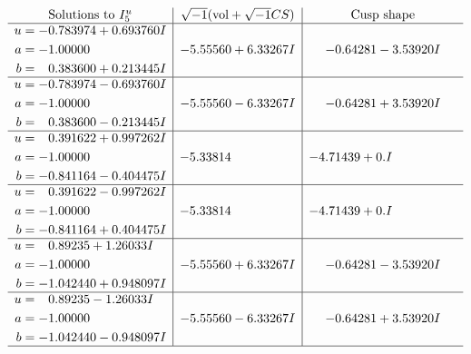 \documentclass[1p]{elsarticle_modified}
\theoremstyle{definition}
\newcommand{\I}{\sqrt{-1}}
\begin{document}
$$\begin{array}{c|c|c}  
\text{Solutions to }I^u_{5}& \I (\text{vol} + \sqrt{-1}CS) & \text{Cusp shape}\\
 \hline 
\begin{aligned}
u &= -0.783974 + 0.693760 I \\
a &= -1.00000\phantom{ +0.000000I} \\
b &= \phantom{-}0.383600 + 0.213445 I\end{aligned}
 & -5.55560 + 6.33267 I & -0.64281 - 3.53920 I \\ \hline\begin{aligned}
u &= -0.783974 - 0.693760 I \\
a &= -1.00000\phantom{ +0.000000I} \\
b &= \phantom{-}0.383600 - 0.213445 I\end{aligned}
 & -5.55560 - 6.33267 I & -0.64281 + 3.53920 I \\ \hline\begin{aligned}
u &= \phantom{-}0.391622 + 0.997262 I \\
a &= -1.00000\phantom{ +0.000000I} \\
b &= -0.841164 - 0.404475 I\end{aligned}
 & -5.33814\phantom{ +0.000000I} & -4.71439 + 0. I\phantom{ +0.000000I} \\ \hline\begin{aligned}
u &= \phantom{-}0.391622 - 0.997262 I \\
a &= -1.00000\phantom{ +0.000000I} \\
b &= -0.841164 + 0.404475 I\end{aligned}
 & -5.33814\phantom{ +0.000000I} & -4.71439 + 0. I\phantom{ +0.000000I} \\ \hline\begin{aligned}
u &= \phantom{-}0.89235 + 1.26033 I \\
a &= -1.00000\phantom{ +0.000000I} \\
b &= -1.042440 + 0.948097 I\end{aligned}
 & -5.55560 + 6.33267 I & -0.64281 - 3.53920 I \\ \hline\begin{aligned}
u &= \phantom{-}0.89235 - 1.26033 I \\
a &= -1.00000\phantom{ +0.000000I} \\
b &= -1.042440 - 0.948097 I\end{aligned}
 & -5.55560 - 6.33267 I & -0.64281 + 3.53920 I\\
 \hline 
 \end{array}$$\newpage\newpage\renewcommand{\arraystretch}{1}
\end{document}
